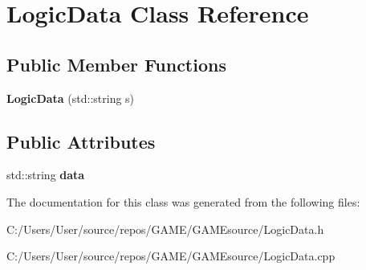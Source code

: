 \hypertarget{class_logic_data}{}\section{Logic\+Data Class Reference}
\label{class_logic_data}
\subsection*{Public Member Functions}
\begin{DoxyCompactItemize}
\item 
\mbox{\label{class_logic_data_a182f7a8ffcbb3401e55e2922753c17bb}} 
{\bfseries Logic\+Data} (std\+::string s)
\end{DoxyCompactItemize}
\subsection*{Public Attributes}
\begin{DoxyCompactItemize}
\item 
\mbox{\label{class_logic_data_a59c1bf0acf3ec2ea31d3bbf814740f2e}} 
std\+::string {\bfseries data}
\end{DoxyCompactItemize}


The documentation for this class was generated from the following files\+:\begin{DoxyCompactItemize}
\item 
C\+:/\+Users/\+User/source/repos/\+G\+A\+M\+E/\+G\+A\+M\+Esource/Logic\+Data.\+h\item 
C\+:/\+Users/\+User/source/repos/\+G\+A\+M\+E/\+G\+A\+M\+Esource/Logic\+Data.\+cpp\end{DoxyCompactItemize}
